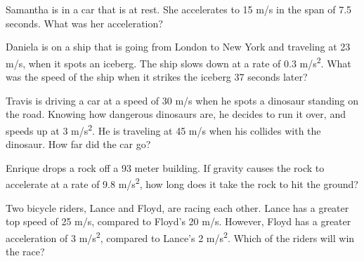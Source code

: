 \documentclass[11pt]{examdesign}
\begin{document}
\begin{multiplechoice} [title={Multiple Choice},
	rearrange=no]

	
	\begin{question}
	
	Samantha is in a car that is at rest.  She accelerates to 15 m/s in the span of 7.5 seconds.  What was her acceleration?  

	\end{question}


\begin{question}
	Daniela is on a ship that is going from London to New York and traveling at 23 m/s, when it spots an iceberg.  The ship slows down at a rate of 0.3 m/s\textsuperscript{2}.  What was the speed of the ship when it strikes the iceberg 37 seconds later?  
	\choice {6.9 m/s}
	\choice [!]{11.9 m/s}
	\choice {34.1 m/s}
	\choice {255.3 m/s}
\end{question}

	\begin{question}
	Travis is driving a car at a speed of 30 m/s when he spots a dinosaur standing on the road. Knowing how dangerous dinosaurs are, he decides to run it over, and speeds up at 3 m/s\textsuperscript{2}. He is traveling at 45 m/s when his collides with the dinosaur.  How far did the car go? 
\end{question}


	\begin{question}
	Enrique drops a rock off a 93 meter building.  If gravity causes the rock to accelerate at a rate of 9.8 m/s\textsuperscript{2}, how long does it take the rock to hit the ground?
\end{question}


\begin{question}
	Two bicycle riders, Lance and Floyd, are racing each other. Lance has a greater top speed of 25 m/s, compared to Floyd's 20 m/s.  However, Floyd has a greater acceleration of 3 m/s\textsuperscript{2}, compared to Lance's 2 m/s\textsuperscript{2}.  Which of the riders will win the race?
	

\end{question}
\end{multiplechoice}
\end{document}
